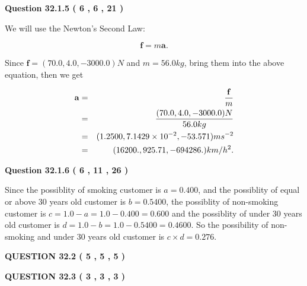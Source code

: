 \documentclass[12pt]{article}
\begin{document}
  
\vspace{0.2in}
  
{\textbf{\Large{Question
32.1.5 
 (           6 ,           6 ,          21 )
}}}
  
  
 
 

We will use the Newton's Second Law:
 
\[
\mathbf{f}=m\mathbf{a}.
\]
 
Since $\mathbf{f}=( %
70.0,  %
4.0,  %
-3000.0 )N$
and $m= %
56.0 kg$, bring them into the above equation, then we get
 
\begin{eqnarray*}
\mathbf{a}&=&\frac{\mathbf{f}}m  \\
&=&\frac{(
70.0 ,
4.0 ,
-3000.0 )N
}{ %
56.0 kg}  \\
&=&(
1.2500 ,
7.1429 \times 10^{-2},
-53.571
)ms^{-2} \\
&=&(
16200. ,
925.71 ,
-694286.
)km/h^2.
\end{eqnarray*}
 
 
 
  
\vspace{0.2in}
  
{\textbf{\Large{Question
32.1.6 
 (           6 ,          11 ,          26 )
}}}
  
  
 
 

Since the possiblity of  %
smoking customer is $ a =  %
0.400 $,
and the possiblity of  %
equal or above 30 years old customer is $ b =  %
0.5400 $,
the possiblity of  %
non-smoking customer is $ c = 1.0 - a = 1.0 -
0.400
=  %
0.600 $ and the possiblity of  %
under 30 years old
customer is $ d = 1.0 - b = 1.0 -  %
0.5400 =  %
0.4600  $.
So the possibility of  %
 non-smoking and  %
under 30 years old
customer is $ c \times d =  %
0.276 $.
 
 
 
  
\vspace{0.2in}
  
{\textbf{\Large{QUESTION
32.2 
 (           5 ,           5 ,           5 )
}}}
  
  
  
\vspace{0.2in}
  
{\textbf{\Large{QUESTION
32.3 
 (           3 ,           3 ,           3 )
}}}
  
  
  
\vspace{0.2in}
  
\end{document}
